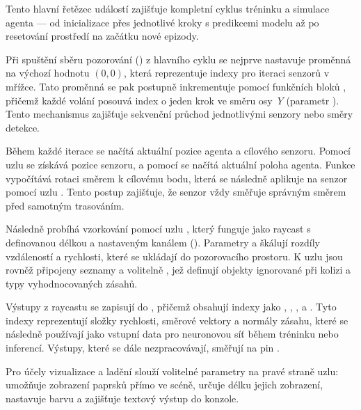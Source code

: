 Tento hlavní řetězec událostí zajišťuje kompletní cyklus tréninku a simulace agenta — od inicializace přes jednotlivé kroky s predikcemi modelu až po resetování prostředí na začátku nové epizody.

Při spuštění sběru pozorování () z hlavního cyklu se nejprve nastavuje proměnná  na výchozí hodnotu $(0,0)$, která reprezentuje indexy pro iteraci senzorů v mřížce. Tato proměnná se pak postupně inkrementuje pomocí funkčních bloků , přičemž každé volání posouvá index o jeden krok ve směru osy~$Y$ (parametr ). Tento mechanismus zajišťuje sekvenční průchod jednotlivými senzory nebo směry detekce.

\newpage

Během každé iterace se načítá aktuální pozice agenta a cílového senzoru. Pomocí uzlu  se získává pozice senzoru, a pomocí  se načítá aktuální poloha agenta. Funkce  vypočítává rotaci směrem k cílovému bodu, která se následně aplikuje na senzor pomocí uzlu . Tento postup zajišťuje, že senzor vždy směřuje správným směrem před samotným trasováním.

Následně probíhá vzorkování pomocí uzlu , který funguje jako raycast s definovanou délkou a nastaveným kanálem (). Parametry  a  škálují rozdíly vzdáleností a rychlosti, které se ukládají do pozorovacího prostoru. K uzlu jsou rovněž připojeny seznamy  a volitelně , jež definují objekty ignorované při kolizi a typy vyhodnocovaných zásahů.

Výstupy z raycastu se zapisují do , přičemž obsahují indexy jako , , ,  a . Tyto indexy reprezentují složky rychlosti, směrové vektory a normály zásahu, které se následně používají jako vstupní data pro neuronovou síť během tréninku nebo inferencí. Výstupy, které se dále nezpracovávají, směřují na pin .

Pro účely vizualizace a ladění slouží volitelné parametry na pravé straně uzlu:  umožňuje zobrazení paprsků přímo ve scéně,  určuje délku jejich zobrazení,  nastavuje barvu a  zajišťuje textový výstup do konzole.


